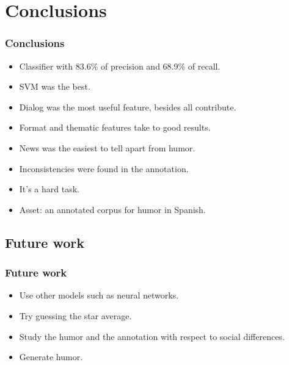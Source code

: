 \section{Conclusions}

\begin{frame}
    \frametitle{Conclusions}

    \begin{itemize}
        \item[\checkmark] Classifier with 83.6\% of precision and 68.9\% of recall.
        \item[\checkmark] SVM was the best.
        \item[\checkmark] Dialog was the most useful feature, besides all contribute.
        \item[\checkmark] Format and thematic features take to good results.
        \item[\checkmark] News was the easiest to tell apart from humor.
        \item[\checkmark] Inconsistencies were found in the annotation.
        \item[\checkmark] It's a hard task.
        \item[\checkmark] Asset: an annotated corpus for humor in Spanish.
    \end{itemize}
\end{frame}

\subsection{Future work}
\begin{frame}
    \frametitle{Future work}

    \begin{itemize}
        \item Use other models such as neural networks.
        \item Try guessing the star average.
        \item Study the humor and the annotation with respect to social differences.
        \item Generate humor.
    \end{itemize}
\end{frame}
